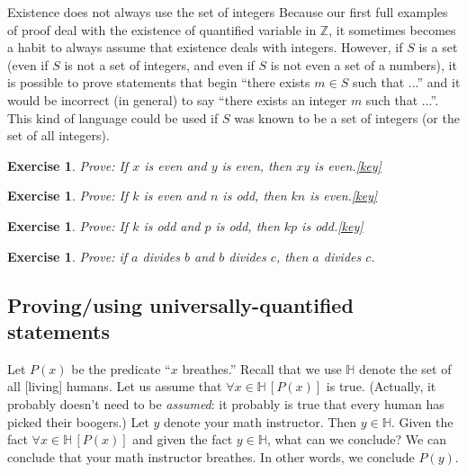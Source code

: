 \documentclass{book}
\newcounter{ekcounter}%
\theoremstyle{ekimcustom}
\newtheorem{exercise}[ekcounter]{Exercise}
\begin{document}
\begin{bremark}{Existence does not always use the set of integers}{}
Because our first full examples of proof deal with the existence of quantified variable in $\mathbb{Z}$, it sometimes becomes a habit to always assume that existence deals with integers. However, if $S$ is a set (even if $S$ is not a set of integers, and even if $S$ is not even a set of a numbers), it is possible to prove statements that begin ``there exists $m \in S$ such that ...'' and it would be incorrect (in general) to say ``there exists an integer $m$ such that ...''. This kind of language could be used if $S$ was known to be a set of integers (or the set of all integers).
\end{bremark}

\begin{exercise}
Prove: If $x$ is even and $y$ is even, then $xy$ is even.\quad\quad\href{https://www.sharelatex.com/project/59ceb69336e6671a14199af2}{{\color{red}[key]}}
\end{exercise}

\begin{exercise}
Prove: If $k$ is even and $n$ is odd, then $kn$ is even.\quad\quad\href{https://www.sharelatex.com/project/59ceb6b336e6671a14199b04}{{\color{red}[key]}}
\end{exercise}

\begin{exercise}
Prove: If $k$ is odd and $p$ is odd, then $kp$ is odd.\quad\quad\href{https://www.sharelatex.com/project/59ceb6f236e6671a14199b0e}{{\color{red}[key]}}
\end{exercise}

\begin{exercise}
Prove: if $a$ divides $b$ and $b$ divides $c$, then $a$ divides $c$.
\end{exercise}

\subsection{Proving/using universally-quantified statements}\label{section:proving-using-forall}

Let $P(x)$ be the predicate ``$x$ breathes.'' Recall that we use $\mathbb{H}$ denote the set of all [living] humans. Let us assume that $\forall x \in \mathbb{H}\,[P(x)]$ is true. (Actually, it probably doesn't need to be \emph{assumed}: it probably is true that every human has picked their boogers.) Let $y$ denote your math instructor. Then $y \in \mathbb{H}$. Given the fact $\forall x \in \mathbb{H}\,[P(x)]$ and given the fact $y \in \mathbb{H}$, what can we conclude? We can conclude that your math instructor breathes. In other words, we conclude $P(y)$.
\end{document}
